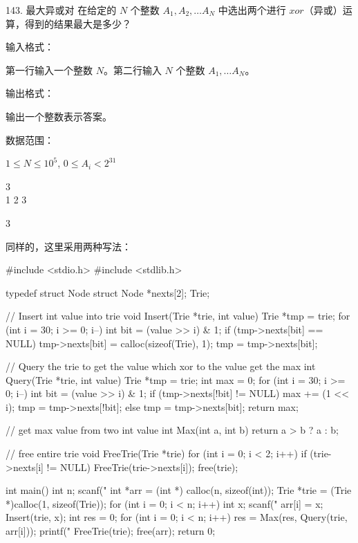 \begin{titledbox}{143. 最大异或对}
    在给定的 $N$ 个整数 $A_1, A_2, \dots A_N$ 中选出两个进行 $xor$（异或）运算，得到的结果最大是多少？

    输入格式：

    第一行输入一个整数 $N$。第二行输入 $N$ 个整数 $A_1, \dots A_N$。

    输出格式：

    输出一个整数表示答案。

    数据范围：

    $1 \le N \le 10^5$, $0 \le A_i < 2^{31}$

    \begin{inputblock}
        3 \\
        1 2 3
    \end{inputblock}
    \begin{outputblock}
        3
    \end{outputblock}
\end{titledbox}

同样的，这里采用两种写法：

\begin{mycpptwocol}[链表形式的Trie]
    #include <stdio.h>
    #include <stdlib.h>

    typedef struct Node {
        struct Node *nexts[2];
    } Trie;

    // Insert int value into trie
    void Insert(Trie *trie, int value) {
        Trie *tmp = trie;
        for (int i = 30; i >= 0; i--) {
            int bit = (value >> i) & 1;
            if (tmp->nexts[bit] == NULL) {
                tmp->nexts[bit] = calloc(sizeof(Trie), 1);
            }
            tmp = tmp->nexts[bit];
        }
    }

    // Query the trie to get the value which xor to the value get the max
    int Query(Trie *trie, int value) {
        Trie *tmp = trie;
        int max = 0;
        for (int i = 30; i >= 0; i--) {
            int bit = (value >> i) & 1;
            if (tmp->nexts[!bit] != NULL) {
                max += (1 << i);
                tmp = tmp->nexts[!bit];
            } else {
                tmp = tmp->nexts[bit];
            }
        }
        return max;
    }

    // get max value from two int value
    int Max(int a, int b) {
        return a > b ? a : b;
    }

    // free entire trie
    void FreeTrie(Trie *trie) {
        for (int i = 0; i < 2; i++) {
            if (trie->nexts[i] != NULL) {
                FreeTrie(trie->nexts[i]);
            }
        }
        free(trie);
    }

    int main()
        {
        int n;
        scanf("%
        int *arr = (int *) calloc(n, sizeof(int));
        Trie *trie = (Trie *)calloc(1, sizeof(Trie));
        for (int i = 0; i < n; i++) {
            int x;
            scanf("%
            arr[i] = x;
            Insert(trie, x);
        }
        int res = 0;
        for (int i = 0; i < n; i++) {
            res = Max(res, Query(trie, arr[i]));
        }
        printf("%
        FreeTrie(trie);
        free(arr);
        return 0;
    }
\end{mycpptwocol}


